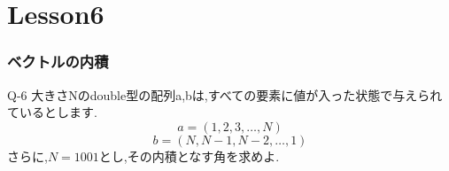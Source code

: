 \documentclass[dvipdfmx]{beamer}
\begin{document}
%

\section{Lesson6}
\begin{frame}
	\frametitle{ベクトルの内積}
	\begin{itembox}[l]{Q-6}
		大きさNのdouble型の配列a,bは,すべての要素に値が入った状態で与えられているとします.\\
		$$a = (1,2,3,\dots,N)$$
		$$b = (N, N-1, N-2,\dots,1)$$
		さらに,$N=1001$とし,その内積となす角を求めよ.
	\end{itembox}
\end{frame}
\end{document}
